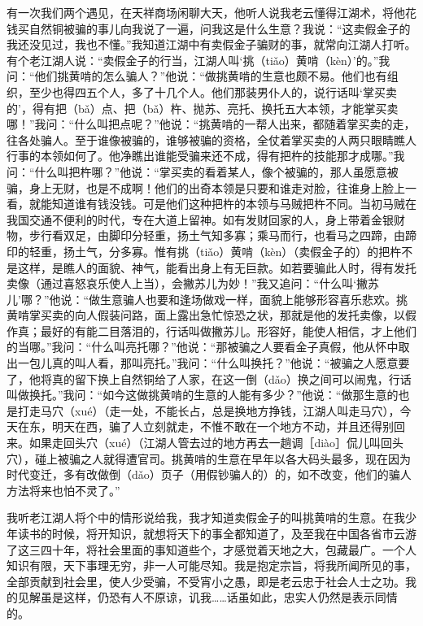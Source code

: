 \documentclass[12pt,UTF8]{ctexbook}
\begin{document}
有一次我们两个遇见，在天祥商场闲聊大天，他听人说我老云懂得江湖术，将他花钱买自然铜被骗的事儿向我说了一遍，问我这是什么生意？我说：“这卖假金子的我还没见过，我也不懂。”我知道江湖中有卖假金子骗财的事，就常向江湖人打听。有个老江湖人说：“卖假金子的行当，江湖人叫‘挑（tiǎo）黄啃（kèn）’的。”我问：“他们挑黄啃的怎么骗人？”他说：“做挑黄啃的生意也颇不易。他们也有组织，至少也得四五个人，多了十几个人。他们那装男仆人的，说行话叫‘掌买卖的’，得有把（bǎ）点、把（bǎ）杵、抛苏、亮托、换托五大本领，才能掌买卖哪！”我问：“什么叫把点呢？”他说：“挑黄啃的一帮人出来，都随着掌买卖的走，往各处骗人。至于谁像被骗的，谁够被骗的资格，全仗着掌买卖的人两只眼睛瞧人行事的本领如何了。他净瞧出谁能受骗来还不成，得有把杵的技能那才成哪。”我问：“什么叫把杵哪？”他说：“掌买卖的看着某人，像个被骗的，那人虽愿意被骗，身上无财，也是不成啊！他们的出奇本领是只要和谁走对脸，往谁身上脸上一看，就能知道谁有钱没钱。可是他们这种把杵的本领与马贼把杵不同。当初马贼在我国交通不便利的时代，专在大道上留神。如有发财回家的人，身上带着金银财物，步行看双足，由脚印分轻重，扬土气知多寡；乘马而行，也看马之四蹄，由蹄印的轻重，扬土气，分多寡。惟有挑（tiǎo）黄啃（kèn）（卖假金子的）的把杵不是这样，是瞧人的面貌、神气，能看出身上有无巨款。如若要骗此人时，得有发托卖像（通过喜怒哀乐使人上当），会撇苏儿为妙！”我又追问：“什么叫‘撇苏儿’哪？”他说：“做生意骗人也要和逢场做戏一样，面貌上能够形容喜乐悲欢。挑黄啃掌买卖的向人假装问路，面上露出急忙惊恐之状，那就是他的发托卖像，以假作真；最好的有能二目落泪的，行话叫做撇苏儿。形容好，能使人相信，才上他们的当哪。”我问：“什么叫亮托哪？”他说：“那被骗之人要看金子真假，他从怀中取出一包儿真的叫人看，那叫亮托。”我问：“什么叫换托？”他说：“被骗之人愿意要了，他将真的留下换上自然铜给了人家，在这一倒（dǎo）换之间可以闹鬼，行话叫做换托。”我问：“如今这做挑黄啃的生意的人能有多少？”他说：“做那生意的也是打走马穴（xué）（走一处，不能长占，总是换地方挣钱，江湖人叫走马穴），今天在东，明天在西，骗了人立刻就走，不惟不敢在一个地方不动，并且还得别回来。如果走回头穴（xué）（江湖人管去过的地方再去一趟调［diào］侃儿叫回头穴），碰上被骗之人就得遭官司。挑黄啃的生意在早年以各大码头最多，现在因为时代变迁，多有改做倒（dǎo）页子（用假钞骗人的）的，如不改变，他们的骗人方法将来也怕不灵了。”

我听老江湖人将个中的情形说给我，我才知道卖假金子的叫挑黄啃的生意。在我少年读书的时候，将开知识，就想将天下的事全都知道了，及至我在中国各省市云游了这三四十年，将社会里面的事知道些个，才感觉着天地之大，包藏最广。一个人知识有限，天下事理无穷，非一人可能尽知。我是抱定宗旨，将我所闻所见的事，全部贡献到社会里，使人少受骗，不受宵小之愚，即是老云忠于社会人士之功。我的见解虽是这样，仍恐有人不原谅，讥我……话虽如此，忠实人仍然是表示同情的。
\end{document}
